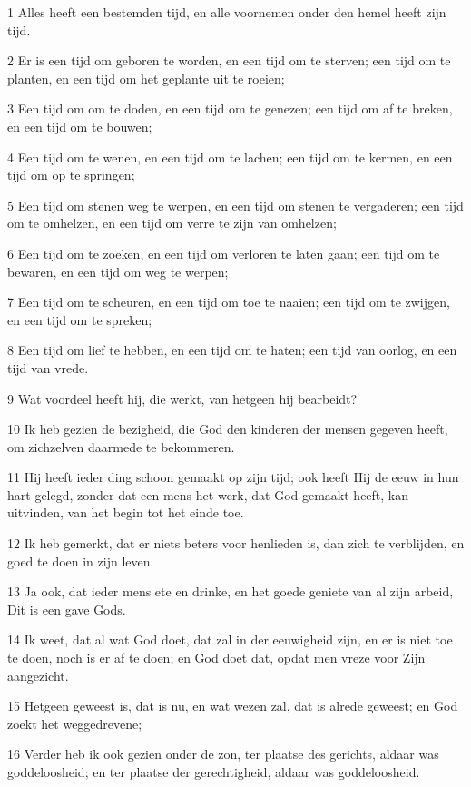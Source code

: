 \par 1 Alles heeft een bestemden tijd, en alle voornemen onder den hemel heeft zijn tijd.
\par 2 Er is een tijd om geboren te worden, en een tijd om te sterven; een tijd om te planten, en een tijd om het geplante uit te roeien;
\par 3 Een tijd om om te doden, en een tijd om te genezen; een tijd om af te breken, en een tijd om te bouwen;
\par 4 Een tijd om te wenen, en een tijd om te lachen; een tijd om te kermen, en een tijd om op te springen;
\par 5 Een tijd om stenen weg te werpen, en een tijd om stenen te vergaderen; een tijd om te omhelzen, en een tijd om verre te zijn van omhelzen;
\par 6 Een tijd om te zoeken, en een tijd om verloren te laten gaan; een tijd om te bewaren, en een tijd om weg te werpen;
\par 7 Een tijd om te scheuren, en een tijd om toe te naaien; een tijd om te zwijgen, en een tijd om te spreken;
\par 8 Een tijd om lief te hebben, en een tijd om te haten; een tijd van oorlog, en een tijd van vrede.
\par 9 Wat voordeel heeft hij, die werkt, van hetgeen hij bearbeidt?
\par 10 Ik heb gezien de bezigheid, die God den kinderen der mensen gegeven heeft, om zichzelven daarmede te bekommeren.
\par 11 Hij heeft ieder ding schoon gemaakt op zijn tijd; ook heeft Hij de eeuw in hun hart gelegd, zonder dat een mens het werk, dat God gemaakt heeft, kan uitvinden, van het begin tot het einde toe.
\par 12 Ik heb gemerkt, dat er niets beters voor henlieden is, dan zich te verblijden, en goed te doen in zijn leven.
\par 13 Ja ook, dat ieder mens ete en drinke, en het goede geniete van al zijn arbeid, Dit is een gave Gods.
\par 14 Ik weet, dat al wat God doet, dat zal in der eeuwigheid zijn, en er is niet toe te doen, noch is er af te doen; en God doet dat, opdat men vreze voor Zijn aangezicht.
\par 15 Hetgeen geweest is, dat is nu, en wat wezen zal, dat is alrede geweest; en God zoekt het weggedrevene;
\par 16 Verder heb ik ook gezien onder de zon, ter plaatse des gerichts, aldaar was goddeloosheid; en ter plaatse der gerechtigheid, aldaar was goddeloosheid.

